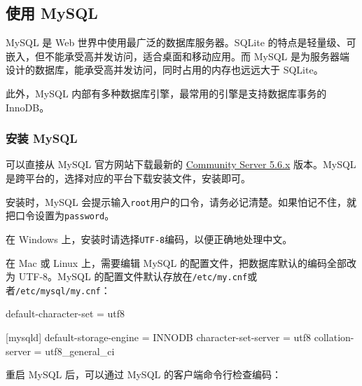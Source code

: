 \hypertarget{ux4f7fux7528-mysql}{%
\subsection{使用 MySQL}\label{ux4f7fux7528-mysql}}

MySQL 是 Web 世界中使用最广泛的数据库服务器。SQLite
的特点是轻量级、可嵌入，但不能承受高并发访问，适合桌面和移动应用。而
MySQL
是为服务器端设计的数据库，能承受高并发访问，同时占用的内存也远远大于
SQLite。

此外，MySQL 内部有多种数据库引擎，最常用的引擎是支持数据库事务的
InnoDB。

\hypertarget{ux5b89ux88c5-mysql}{%
\subsubsection{安装 MySQL}\label{ux5b89ux88c5-mysql}}

可以直接从 MySQL 官方网站下载最新的
\href{http://dev.mysql.com/downloads/mysql/5.6.html}{Community Server
5.6.x} 版本。MySQL 是跨平台的，选择对应的平台下载安装文件，安装即可。

安装时，MySQL
会提示输入\texttt{root}用户的口令，请务必记清楚。如果怕记不住，就把口令设置为\texttt{password}。

在 Windows 上，安装时请选择\texttt{UTF-8}编码，以便正确地处理中文。

在 Mac 或 Linux 上，需要编辑 MySQL
的配置文件，把数据库默认的编码全部改为 UTF-8。MySQL
的配置文件默认存放在\texttt{/etc/my.cnf}或者\texttt{/etc/mysql/my.cnf}：

\begin{pythoncode}
[client]
default-character-set = utf8

[mysqld]
default-storage-engine = INNODB
character-set-server = utf8
collation-server = utf8_general_ci
\end{pythoncode}

重启 MySQL 后，可以通过 MySQL 的客户端命令行检查编码：


